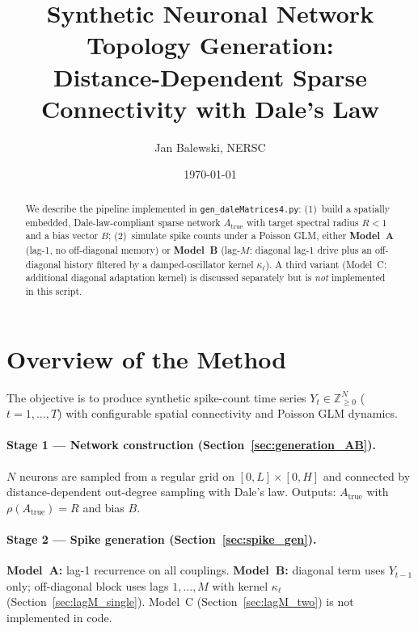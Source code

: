 \documentclass[11pt]{article}
\title{Synthetic Neuronal Network Topology Generation:\\
Distance-Dependent Sparse Connectivity with Dale's Law}
\author{Jan Balewski, NERSC}
\date{\today}
\begin{document}
\maketitle

\begin{abstract}
We describe the pipeline implemented in \texttt{gen\_daleMatrices4.py}:
(1)~build a spatially embedded, Dale-law-compliant sparse network
$A_{\text{true}}$ with target spectral radius $R<1$ and a bias vector $B$;
(2)~simulate spike counts under a Poisson GLM, either
\textbf{Model~A} (lag-1, no off-diagonal memory) or
\textbf{Model~B} (lag-$M$: diagonal lag-1 drive plus an off-diagonal
history filtered by a damped-oscillator kernel $\kappa_\ell$).
A third variant (Model~C: additional diagonal adaptation kernel) is
discussed separately but is \emph{not} implemented in this script.
\end{abstract}

\tableofcontents
\newpage

\section{Overview of the Method}
\label{sec:overview}

The objective is to produce synthetic spike-count time series
$Y_t\in\mathbb{Z}_{\geq 0}^{N}$ ($t=1,\dots,T$) with configurable
spatial connectivity and Poisson GLM dynamics.

\paragraph{Stage 1 --- Network construction (Section~\ref{sec:generation_AB}).}
$N$ neurons are sampled from a regular grid on $[0,L]\times[0,H]$ and
connected by distance-dependent out-degree sampling with Dale's law.
Outputs: $A_{\text{true}}$ with $\rho(A_{\text{true}})=R$ and bias $B$.

\paragraph{Stage 2 --- Spike generation (Section~\ref{sec:spike_gen}).}
\textbf{Model~A:} lag-1 recurrence on all couplings.
\textbf{Model~B:} diagonal term uses $Y_{t-1}$ only; off-diagonal
block uses lags $1,\dots,M$ with kernel $\kappa_\ell$ (Section~\ref{sec:lagM_single}).
Model~C (Section~\ref{sec:lagM_two}) is not implemented in code.
\end{document}

